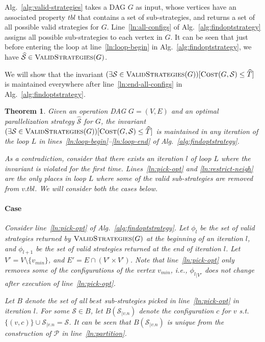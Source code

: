 \documentclass{article}
\newcommand{\rom}[1]{\uppercase\expandafter{\romannumeral #1\relax}}
\newcommand{\strategy}{\mathcal{S}}
\newcommand{\optstrategy}{\widehat{\mathcal{S}}}
\newcommand{\optcost}{\widehat{T}}
\newcommand{\minv}{v_{min}}
\newtheorem{theorem}{Theorem}
\newcommand{\set}[1]{\{#1\}}
\begin{document}
Alg.~\ref{alg:valid-strategies} takes a DAG $G$ as input, whose vertices
have an associated property $tbl$ that contains a set of sub-strategies, and
returns a set of all possible valid strategies for $G$.
Line~\ref{ln:all-configs} of Alg.~\ref{alg:findoptstrategy} assigns all possible
sub-strategies to each vertex in $G$. It can be seen that just before
entering the loop at line~\ref{ln:loop-begin} in Alg.~\ref{alg:findoptstrategy},
we have $\optstrategy \in \Call{ValidStrategies}{G}$.

We will show that the invariant $(\exists\strategy \in
\Call{ValidStrategies}{G})[\Call{Cost}{G, \strategy} \le \optcost]$ is
maintained everywhere after line~\ref{ln:end-all-configs} in
Alg.~\ref{alg:findoptstrategy}.

\begin{theorem}
	Given an operation DAG $G=(V,E)$ and an optimal parallelization strategy
	$\optstrategy$ for $G$,  the invariant $(\exists\strategy \in
	\Call{ValidStrategies}{G})[\Call{Cost}{G, \strategy} \le \optcost]$ is
	maintained in any iteration of the loop $L$ in
	lines~\ref{ln:loop-begin}--\ref{ln:loop-end} of
	Alg.~\ref{alg:findoptstrategy}.

	\proof
	As a contradiction, consider that there exists an iteration $l$ of loop $L$
	where the invariant is violated for the first time. 
	Lines~\ref{ln:pick-opt} and \ref{ln:restrict-neigh} are the only places in
	loop $L$ where some of the valid sub-strategies are removed from $v.tbl$. We
	will consider both the cases below.

	\paragraph{Case \rom{1}}
	Consider line~\ref{ln:pick-opt} of Alg.~\ref{alg:findoptstrategy}.  Let
	$\phi_{l}$ be the set of valid strategies returned by
	$\Call{ValidStrategies}{G}$ at the beginning of an iteration $l$, and
	$\phi_{l+1}$ be the set of valid strategies returned at the end of iteration
	$l$.
	Let $V' = V \setminus \set{\minv}$, and $E' = E \cap (V'\times V')$.
	Note that line~\ref{ln:pick-opt} only removes some of the configurations of
	the vertex $\minv$, i.e., ${\phi_l}_{|V'}$ does not change after execution of
	line~\ref{ln:pick-opt}. 

	Let $B$ denote the set of all $best$ sub-strategies picked in
	line~\ref{ln:pick-opt} in iteration $l$. For some $\strategy \in B$,
	let $B(\strategy_{|v.n})$ denote the configuration $c$ for $v$ s.t.
	$\set{(v,c)} \cup \strategy_{|v.n} = \strategy$.
	It can be seen that $B(\strategy_{|v.n})$ is unique from the construction of
	$\mathcal{P}$ in line~\ref{ln:partition}. 
	

\end{theorem}
\end{document}
